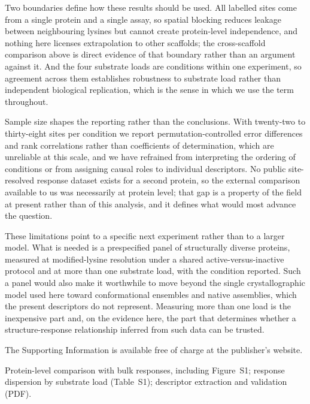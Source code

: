 \documentclass[journal=jprobs,manuscript=article,layout=traditional]{achemso}
\begin{document}
Two boundaries define how these results should be used. All labelled sites come from a single protein and a single assay, so spatial blocking reduces leakage between neighbouring lysines but cannot create protein-level independence, and nothing here licenses extrapolation to other scaffolds; the cross-scaffold comparison above is direct evidence of that boundary rather than an argument against it. And the four substrate loads are conditions within one experiment, so agreement across them establishes robustness to substrate load rather than independent biological replication, which is the sense in which we use the term throughout.

Sample size shapes the reporting rather than the conclusions. With twenty-two to thirty-eight sites per condition we report permutation-controlled error differences and rank correlations rather than coefficients of determination, which are unreliable at this scale, and we have refrained from interpreting the ordering of conditions or from assigning causal roles to individual descriptors. No public site-resolved response dataset exists for a second protein, so the external comparison available to us was necessarily at protein level; that gap is a property of the field at present rather than of this analysis, and it defines what would most advance the question.

These limitations point to a specific next experiment rather than to a larger model. What is needed is a prespecified panel of structurally diverse proteins, measured at modified-lysine resolution under a shared active-versus-inactive protocol and at more than one substrate load, with the condition reported. Such a panel would also make it worthwhile to move beyond the single crystallographic model used here toward conformational ensembles and native assemblies, which the present descriptors do not represent. Measuring more than one load is the inexpensive part and, on the evidence here, the part that determines whether a structure-response relationship inferred from such data can be trusted.

\begin{suppinfo}

The Supporting Information is available free of charge at the publisher's website.

\par Protein-level comparison with bulk responses, including Figure~S1; response dispersion by substrate load (Table~S1); descriptor extraction and validation (PDF).

\end{suppinfo}
\end{document}
